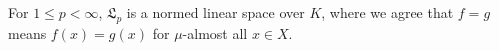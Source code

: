 For $1 \leq p < \infty$, $\mathfrak{L}_p$ is a normed linear space over $K$, where we agree that $f = g$ means $f(x) = g(x)$ for $\mu$-almost all $x \in X$.
